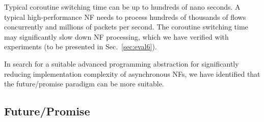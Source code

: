 Typical coroutine switching time can be up to hundreds of nano seconds. A typical high-performance NF needs to process hundreds of thousands of flows concurrently and millions of packets per second. The coroutine switching time may significantly slow down NF processing, which we have verified with experiments (to be presented in Sec.~\ref{sec:eval6}). %

In search for a suitable advanced programming abstraction for significantly reducing implementation complexity of asynchronous NFs, we have identified that the future/promise paradigm can be more suitable. %







\subsection{Future/Promise}
\label{sec:intro-future-promise}

